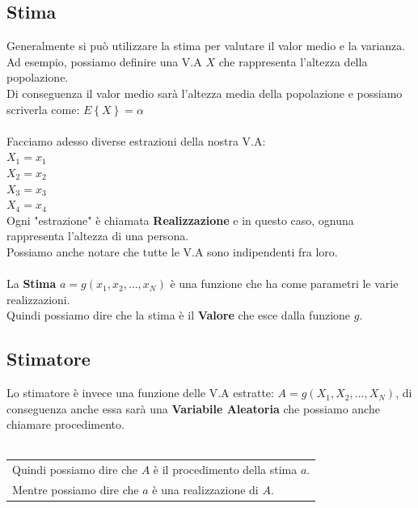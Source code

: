 \documentclass{article}
\begin{document}
\subsection{Stima}
Generalmente si può utilizzare la stima per valutare il valor medio e la varianza. \\
Ad esempio, possiamo definire una V.A $X$ che rappresenta l'altezza della popolazione. \\
Di conseguenza il valor medio sarà l'altezza media della popolazione e possiamo scriverla come: $E\left\{ X \right\} = \alpha$ \\ \\
Facciamo adesso diverse estrazioni della nostra V.A: \\
$X_1 = x_1$ \\
$X_2 = x_2$ \\
$X_3 = x_3$ \\
$X_4 = x_4$ \\
Ogni "estrazione" è chiamata \textbf{Realizzazione} e in questo caso, ognuna rappresenta l'altezza di una persona. \\
Possiamo anche notare che tutte le V.A sono indipendenti fra loro. \\ \\
La \textbf{Stima} $a = g(x_1, x_2, \dots, x_N)$ è una funzione che ha come parametri le varie realizzazioni. \\
Quindi possiamo dire che la stima è il \textbf{Valore} che esce dalla funzione $g$.
\subsection{Stimatore}
Lo stimatore è invece una funzione delle V.A estratte: $A = g(X_1, X_2, \dots, X_N)$, di conseguenza anche essa sarà una \textbf{Variabile Aleatoria} che possiamo anche chiamare procedimento. \\ \\
\begin{tabular}{|p{13cm}}
Quindi possiamo dire che $A$ è il procedimento della stima $a$. \\
Mentre possiamo dire che $a$ è una realizzazione di $A$.
\end{tabular} \\
\end{document}
